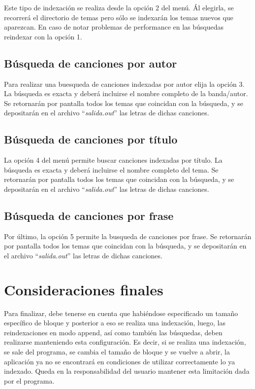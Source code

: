 \documentclass{article}
\begin{document}
	Este tipo de indexación se realiza desde la opción 2 del menú. Ál elegirla, se recorrerá el directorio de temas pero sólo se indexarán los temas nuevos que aparezcan. En caso de notar problemas de performance en las búsquedas reindexar con la opción 1.
\bigskip



\subsection{Búsqueda de canciones por autor}

	Para realizar una buesqueda de canciones indexadas por autor elija la opción 3. La búsqueda es exacta y deberá incluirse el nombre completo de la banda/autor. Se retornarán por pantalla todos los temas que coincidan con la búsqueda, y se depositarán en el archivo ``\textit{salida.out}'' las letras de dichas canciones.
\bigskip



\subsection{Búsqueda de canciones por título}

	La opción 4 del menú permite buscar canciones indexadas por título. La búsqueda es exacta y deberá incluirse el nombre completo del tema. Se retornarán por pantalla todos los temas que coincidan con la búsqueda, y se depositarán en el archivo ``\textit{salida.out}'' las letras de dichas canciones.
\bigskip



\subsection{Búsqueda de canciones por frase}

	Por último, la opción 5 permite la busqueda de canciones por frase. Se retornarán por pantalla todos los temas que coincidan con la búsqueda, y se depositarán en el archivo ``\textit{salida.out}'' las letras de dichas canciones.
\bigskip\bigskip



\section{Consideraciones finales}

	Para finalizar, debe tenerse en cuenta que habiéndose especificado un tamaño específico de bloque y posterior a eso se realiza una indexación, luego, las reindexaciones en modo append, así como también las búsquedas, deben realizarse manteniendo esta configuración. Es decir, si se realiza una indexación, se sale del programa, se cambia el tamaño de bloque y se vuelve a abrir, la aplicación ya no se encontrará en condiciones de utilizar correctamente lo ya indexado. Queda en la responsabilidad del usuario mantener esta limitación dada por el programa.
\bigskip
\end{document}
